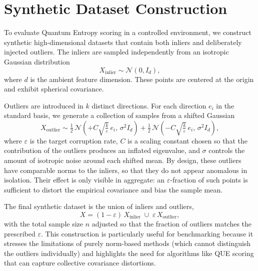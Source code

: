 \documentclass[11pt]{article}
\begin{document}
\section{Synthetic Dataset Construction}

To evaluate Quantum Entropy scoring in a controlled environment, we construct synthetic
high-dimensional datasets that contain both inliers and deliberately injected outliers.
The inliers are sampled independently from an isotropic Gaussian distribution
\[
X_{\text{inlier}} \sim \mathcal{N}(0, I_d),
\]
where $d$ is the ambient feature dimension. These points are centered at the origin
and exhibit spherical covariance.

Outliers are introduced in $k$ distinct directions. For each direction $e_i$ in the
standard basis, we generate a collection of samples from a shifted Gaussian
\[
X_{\text{outlier}} \sim \tfrac{1}{2}\,\mathcal{N}\!\left(+C\sqrt{\tfrac{k}{\varepsilon}}\,e_i,\,
\sigma^2 I_d\right) + \tfrac{1}{2}\,\mathcal{N}\!\left(-C\sqrt{\tfrac{k}{\varepsilon}}\,e_i,\,
\sigma^2 I_d\right),
\]
where $\varepsilon$ is the target corruption rate, $C$ is a scaling constant chosen
so that the contribution of the outliers produces an inflated eigenvalue, and $\sigma$
controls the amount of isotropic noise around each shifted mean.
By design, these outliers have comparable norms to the inliers, so that they do not
appear anomalous in isolation. Their effect is only visible in aggregate: an
$\varepsilon$-fraction of such points is sufficient to distort the empirical covariance
and bias the sample mean.

The final synthetic dataset is the union of inliers and outliers,
\[
X = (1-\varepsilon)\,X_{\text{inlier}} \;\cup\; \varepsilon\,X_{\text{outlier}},
\]
with the total sample size $n$ adjusted so that the fraction of outliers matches the
prescribed $\varepsilon$. This construction is particularly useful for benchmarking
because it stresses the limitations of purely norm-based methods (which cannot
distinguish the outliers individually) and highlights the need for algorithms like
QUE scoring that can capture collective covariance distortions.
\end{document}
